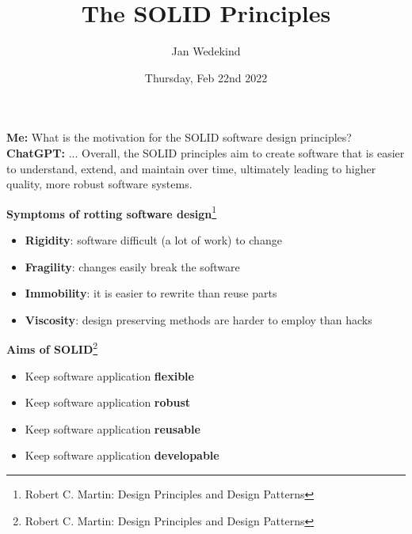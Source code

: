 \documentclass[calcdimensions,landscape,letterpaper]{powersem}
\title{The SOLID Principles}
\author{Jan Wedekind}
\date{Thursday, Feb 22nd 2022}
\newcommand{\thecurrentheading}{}
\newcommand{\heading}[1]{\renewcommand{\thecurrentheading}{#1}}
\begin{document}
\begin{slide}
  \heading{\ }
  \begin{center}
    \maketitle
  \end{center}
\end{slide}

\begin{slide}
  \heading{Motivation}
  \textbf{Me:} What is the motivation for the SOLID software design principles?\\
  \textbf{ChatGPT:} ... Overall, the SOLID principles aim to create software that is easier to understand, extend, and maintain
  over time, ultimately leading to higher quality, more robust software systems.
\end{slide}

\begin{slide}
  \heading{Software Rot}
  \begin{center}
    \textbf{Symptoms of rotting software design}\footnote{Robert C. Martin: Design Principles and Design Patterns}
    \begin{itemize}
      \item \textbf{Rigidity}: software difficult (a lot of work) to change
      \item \textbf{Fragility}: changes easily break the software
      \item \textbf{Immobility}: it is easier to rewrite than reuse parts
      \item \textbf{Viscosity}: design preserving methods are harder to employ than hacks
    \end{itemize}
  \end{center}
\end{slide}

\begin{slide}
  \heading{Aims of SOLID}
  \begin{center}
    \textbf{Aims of SOLID}\footnote{Robert C. Martin: Design Principles and Design Patterns}\medskip\\
    \begin{minipage}[c]{.65\textwidth}
      \begin{itemize}
        \item Keep software application \textbf{flexible}
        \item Keep software application \textbf{robust}
        \item Keep software application \textbf{reusable}
        \item Keep software application \textbf{developable}
      \end{itemize}
    \end{minipage}
  \end{center}
\end{slide}
\end{document}
